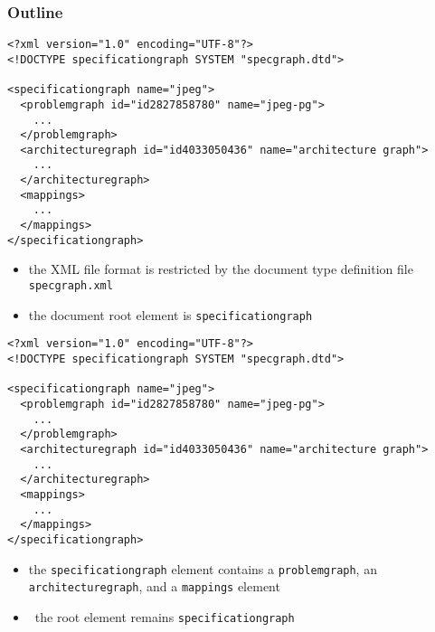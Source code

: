 \begin{frame}
  \frametitle{Outline}
\end{frame}


\begin{frame}[fragile=singleslide]
\begin{lstlisting}
<?xml version="1.0" encoding="UTF-8"?>
<!DOCTYPE specificationgraph SYSTEM "specgraph.dtd">

<specificationgraph name="jpeg">
  <problemgraph id="id2827858780" name="jpeg-pg">
    ...
  </problemgraph>
  <architecturegraph id="id4033050436" name="architecture graph">
    ...
  </architecturegraph>
  <mappings>
    ...
  </mappings>
</specificationgraph>
\end{lstlisting}
\begin{itemize}
\item the XML file format is restricted by the document type definition file \lstinline!specgraph.xml!
\item the document root element is \lstinline|specificationgraph|
\end{itemize}
\end{frame}


\begin{frame}[fragile=singleslide]
\begin{lstlisting}
<?xml version="1.0" encoding="UTF-8"?>
<!DOCTYPE specificationgraph SYSTEM "specgraph.dtd">

<specificationgraph name="jpeg">
  <problemgraph id="id2827858780" name="jpeg-pg">
    ...
  </problemgraph>
  <architecturegraph id="id4033050436" name="architecture graph">
    ...
  </architecturegraph>
  <mappings>
    ...
  </mappings>
</specificationgraph>
\end{lstlisting}
\begin{itemize}
\item the \lstinline|specificationgraph| element contains a \lstinline|problemgraph|, an \lstinline|architecturegraph|, and a \lstinline|mappings| element
\item \IGX\ the root element remains \lstinline|specificationgraph|
\end{itemize}
\end{frame}


